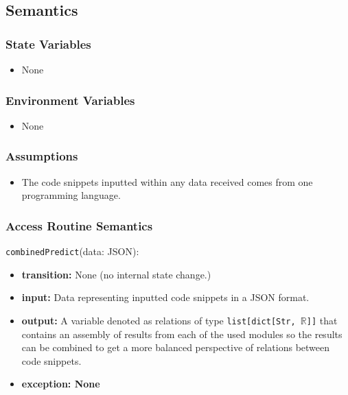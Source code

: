 \documentclass[12pt, titlepage]{article}
\begin{document}
\subsection{Semantics}

\subsubsection{State Variables}

\begin{itemize}
    \item None
\end{itemize}

\subsubsection{Environment Variables}

\begin{itemize}
  \item None
\end{itemize}

\subsubsection{Assumptions}

\begin{itemize}
    \item The code snippets inputted within any data received comes from one programming language.
\end{itemize}

\subsubsection{Access Routine Semantics}
\noindent \texttt{combinedPredict}(data: JSON):
\begin{itemize}
    \item \textbf{transition:} None (no internal state change.)
    \item \textbf{input:} Data representing inputted code snippets in a JSON format.
    \item \textbf{output:} A variable denoted as relations of type \texttt{list[dict[Str, $\mathbb{R}$]]} that contains an assembly of results from each of the used modules so the results can be combined to get a more balanced perspective of relations between code snippets.
    \item \textbf{exception: None}
\end{itemize}
\end{document}
